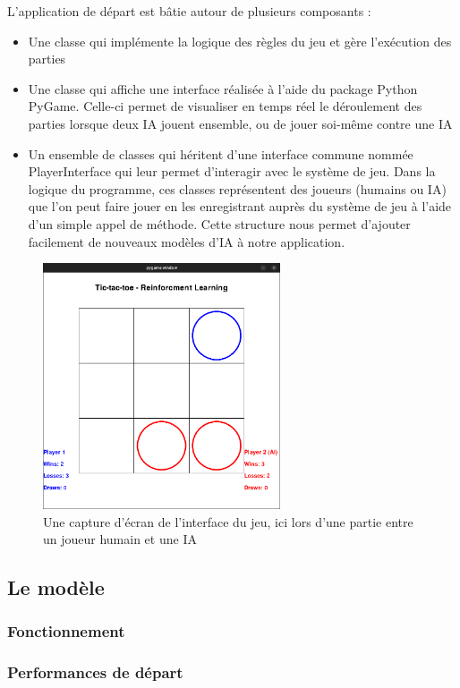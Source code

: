 \documentclass[french]{article}
\begin{document}
    L'application de départ est bâtie autour de plusieurs composants :
    \begin{itemize}
        \item Une classe qui implémente la logique des règles du jeu et gère l'exécution des parties
        \item Une classe qui affiche une interface réalisée à l'aide du package Python PyGame. Celle-ci permet de visualiser en temps réel le déroulement des parties lorsque deux IA jouent ensemble, ou de jouer soi-même contre une IA
        \item Un ensemble de classes qui héritent d'une interface commune nommée PlayerInterface qui leur permet d'interagir avec le système de jeu. Dans la logique du programme, ces classes représentent des joueurs (humains ou IA) que l'on peut faire jouer en les enregistrant auprès du système de jeu à l'aide d'un simple appel de méthode. Cette structure nous permet d'ajouter facilement de nouveaux modèles d'IA à notre application.
    \end{itemize}

    \begin{figure}[h]
        \includegraphics[width=7cm]{game_screenshot}
        \centering
        \caption{Une capture d'écran de l'interface du jeu, ici lors d'une partie entre un joueur humain et une IA}
        \centering
    \end{figure}
    \subsection{Le modèle}
    \subsubsection{Fonctionnement}
    \subsubsection{Performances de départ}
\end{document}
